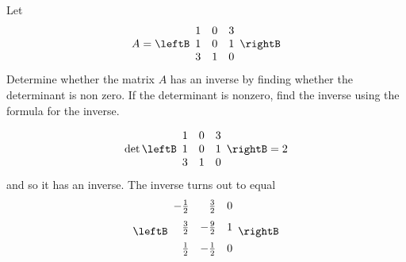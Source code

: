 \begin{enumialphparenastyle}
\begin{ex} Let 
\begin{equation*}
A = 
\leftB
\begin{array}{rrr}
1 & 0 & 3 \\
1 & 0 & 1 \\
3 & 1 & 0
\end{array}
\rightB
\end{equation*}
Determine whether the matrix $A$ has an inverse by finding whether the
determinant is non zero. If the determinant is nonzero, find the inverse
using the formula for the inverse.
\begin{sol}
\[
\det \leftB
\begin{array}{rrr}
1 & 0 & 3 \\
1 & 0 & 1 \\
3 & 1 & 0
\end{array}
\rightB = 2
\]
and so it has an inverse. The inverse turns out to equal
\[
\leftB
\begin{array}{rrr}
-\vspace{0.05in}\frac{1}{2} & \vspace{0.05in}\frac{3}{2} & 0 \\
\vspace{0.05in}\frac{3}{2} & -\vspace{0.05in}\frac{9}{2} & 1 \\
\vspace{0.05in}\frac{1}{2} & -\vspace{0.05in}\frac{1}{2} & 0
\end{array}
\rightB
\]
\end{sol}
\end{ex}


\end{enumialphparenastyle}

